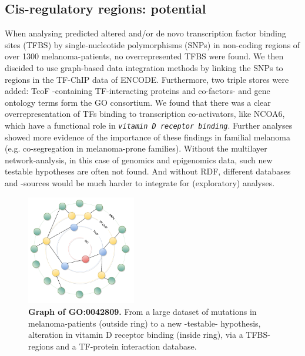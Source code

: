 \documentclass[twoside,fontsize=12pt]{article}
\begin{document}
\subsection*{Cis-regulatory regions: potential}
When analysing predicted altered and/or de novo transcription factor binding sites (TFBS) by single-nucleotide polymorphisms (SNPs) in non-coding regions of over 1300 melanoma-patients, no overrepresented TFBS were found. We then discided to use graph-based data integration methods by linking the SNPs to regions in the TF-ChIP data of ENCODE\cite{ENCODE}. Furthermore, two triple stores were added: TcoF -containing TF-interacting proteins and co-factors- and gene ontology terms form the GO consortium. We found that there was a clear overrepresentation of TFs binding to transcription co-activators, like NCOA6, which have a functional role in \emph{\lstinline|vitamin D receptor binding|}. Further analyses showed more evidence of the importance of these findings in familial melanoma (e.g. co-segregation in melanoma-prone families). Without the multilayer network-analysis, in this case of genomics and epigenomics data, such new testable hypotheses are often not found. And without RDF, different databases and -sources would be much harder to integrate for (exploratory) analyses. 
\begin{figure}[H]
    \centering
    \includegraphics[width=0.425\textwidth]{rondjeGraphs.pdf}
    \caption{\textbf{Graph of GO:0042809.} From a large dataset of mutations in melanoma-patients (outside ring) to a new -testable- hypothesis, alteration in vitamin D receptor binding (inside ring), via a TFBS-regions and a TF-protein interaction database.}
    \label{fig:mela}
\end{figure}
\end{document}
